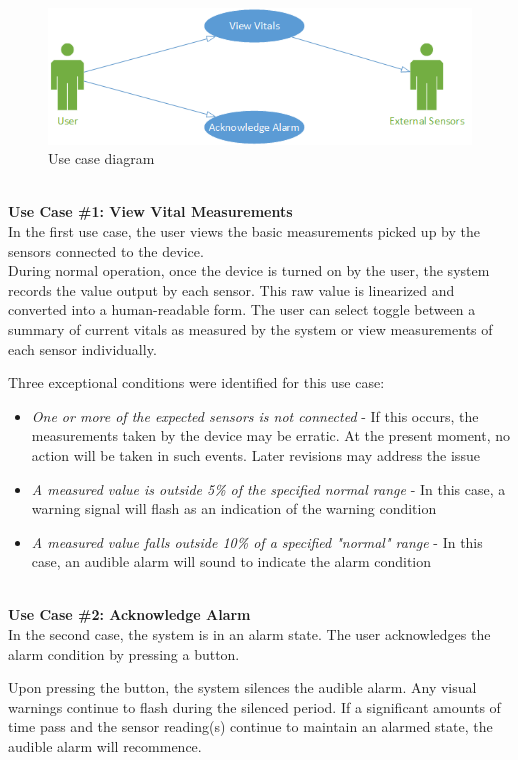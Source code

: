 \documentclass[12pt]{article} %
\begin{document}
\begin{figure}[h]
  \centering
  \includegraphics[width=\textwidth]{../design/use_cases_graphical.png}
  \caption{Use case diagram}
  \label{fig:useCases}
\end{figure}

~\\
\textbf{Use Case \#1: View Vital Measurements } \\
In the first use case, the user views the basic measurements picked up by the
sensors connected to the device. \\
During normal operation, once the device is turned on by the user, the system
records the value output by each sensor. This raw value is linearized and 
converted into a human-readable form. The user can select toggle between a
summary of current vitals as measured by the system or view measurements of
each sensor individually.

Three exceptional conditions were identified for this use case: 
\begin{itemize}
  \item \emph{One or more of the expected sensors is not connected} - If this occurs, the measurements taken by the device may be erratic. At the present moment, no action will be taken in such events. Later revisions may address the issue
  \item \emph{A measured value is outside 5\% of the specified normal range} - In this case, a warning signal will flash as an indication of the warning condition
  \item \emph{A measured value falls outside 10\% of a specified "normal" range} - In this case, an audible alarm will sound to indicate the alarm condition
\end{itemize}

~\\
\textbf{Use Case \#2: Acknowledge Alarm} \\
In the second case, the system is in an alarm state. The user acknowledges
the alarm condition by pressing a button.

Upon pressing the button, the system silences the audible alarm. Any visual
warnings continue to flash during the silenced period. If a significant amounts
of time pass and the sensor reading(s) continue to maintain an alarmed state,
the audible alarm will recommence.
\end{document}
